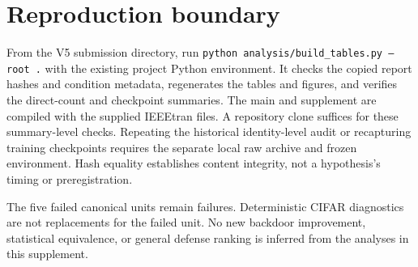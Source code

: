 \documentclass[journal]{IEEEtran}
\begin{document}
\section{Reproduction boundary}
From the V5 submission directory, run \texttt{python analysis/build\_tables.py --root .} with the existing project Python environment. It checks the copied report hashes and condition metadata, regenerates the tables and figures, and verifies the direct-count and checkpoint summaries. The main and supplement are compiled with the supplied IEEEtran files. A repository clone suffices for these summary-level checks. Repeating the historical identity-level audit or recapturing training checkpoints requires the separate local raw archive and frozen environment. Hash equality establishes content integrity, not a hypothesis's timing or preregistration.

The five failed canonical units remain failures. Deterministic CIFAR diagnostics are not replacements for the failed unit. No new backdoor improvement, statistical equivalence, or general defense ranking is inferred from the analyses in this supplement.
\end{document}
